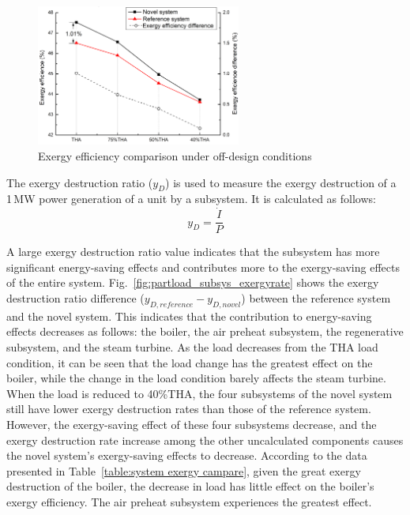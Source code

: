\documentclass[preprint,12pt]{elsarticle}
\begin{document}
\begin{figure}[htbp]
\centering
\includegraphics[width=0.6\textwidth]{fig/partload_efficiency.png}
\caption{Exergy efficiency comparison under off-design conditions} 
\label{fig:partload_efficiency}
\end{figure}
  The exergy destruction ratio ($y_{D}$) is used to measure the exergy destruction of a 1\,MW power generation of a unit by a subsystem. It is calculated as follows:
\begin{equation}
y_{D}=\frac{\dot{I}}{P}
\end{equation}

A large exergy destruction ratio value indicates that the subsystem has more significant energy-saving effects and contributes more to the exergy-saving effects of the entire system.
Fig.~\ref{fig:partload_subsys_exergyrate} shows the exergy destruction ratio difference ($y_{D,reference}-y_{D,novel}$) between the reference system and the novel system.
This indicates that the contribution to energy-saving effects decreases as follows: the boiler, the air preheat subsystem, the regenerative subsystem, and the steam turbine.
As the load decreases from the THA load condition, it can be seen that the load change has the greatest effect on the boiler, while the change in the load condition barely affects the steam turbine.
When the load is reduced to 40\%THA, the four subsystems of the novel system still have lower exergy destruction rates than those of the reference system.
However, the exergy-saving effect of these four subsystems decrease, and the exergy destruction rate increase among the other uncalculated components causes the novel system's exergy-saving effects to decrease.
According to the data presented in Table~\ref{table:system exergy campare}, given the great exergy destruction of the boiler, the decrease in load has little effect on the boiler's exergy efficiency. The air preheat subsystem experiences the greatest effect.
\end{document}
